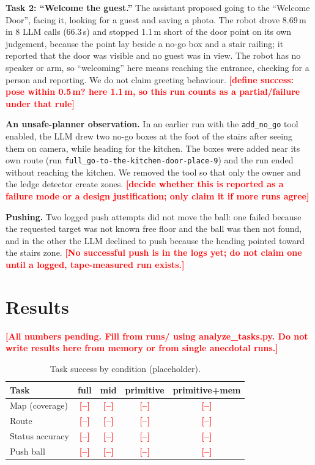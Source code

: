 \documentclass[conference]{IEEEtran}
\newcommand{\todo}[1]{\textcolor{red}{\textbf{[#1]}}}
\begin{document}
\textbf{Task 2: ``Welcome the guest.''}
The assistant proposed going to the ``Welcome Door'', facing it, looking for a guest and saving a photo. The robot drove 8.69\,m in 8 LLM calls (66.3\,s) and stopped 1.1\,m short of the door point on its own judgement, because the point lay beside a no-go box and a stair railing; it reported that the door was visible and no guest was in view.
The robot has no speaker or arm, so ``welcoming'' here means reaching the entrance, checking for a person and reporting. We do not claim greeting behaviour. \todo{define success: pose within 0.5\,m? here 1.1\,m, so this run counts as a partial/failure under that rule}

\textbf{An unsafe-planner observation.} In an earlier run with the \texttt{add\_no\_go} tool enabled, the LLM drew two no-go boxes at the foot of the stairs after seeing them on camera, while heading for the kitchen. The boxes were added near its own route (run \texttt{full\_go-to-the-kitchen-door-place-9}) and the run ended without reaching the kitchen.
We removed the tool so that only the owner and the ledge detector create zones. \todo{decide whether this is reported as a failure mode or a design justification; only claim it if more runs agree}

\textbf{Pushing.} Two logged push attempts did not move the ball: one failed because the requested target was not known free floor and the ball was then not found, and in the other the LLM declined to push because the heading pointed toward the stairs zone. \todo{No successful push is in the logs yet; do not claim one until a logged, tape-measured run exists.}

\section{Results}
\todo{All numbers pending. Fill from runs/ using analyze\_tasks.py. Do not write results here from memory or from single anecdotal runs.}

\begin{table}[t]
\caption{Task success by condition (placeholder).}
\label{tab:results}
\centering
\begin{tabular}{lcccc}
\toprule
Task & full & mid & primitive & primitive+mem \\
\midrule
Map (coverage) & \todo{--} & \todo{--} & \todo{--} & \todo{--} \\
Route & \todo{--} & \todo{--} & \todo{--} & \todo{--} \\
Status accuracy & \todo{--} & \todo{--} & \todo{--} & \todo{--} \\
Push ball & \todo{--} & \todo{--} & \todo{--} & \todo{--} \\
\bottomrule
\end{tabular}
\end{table}
\end{document}
